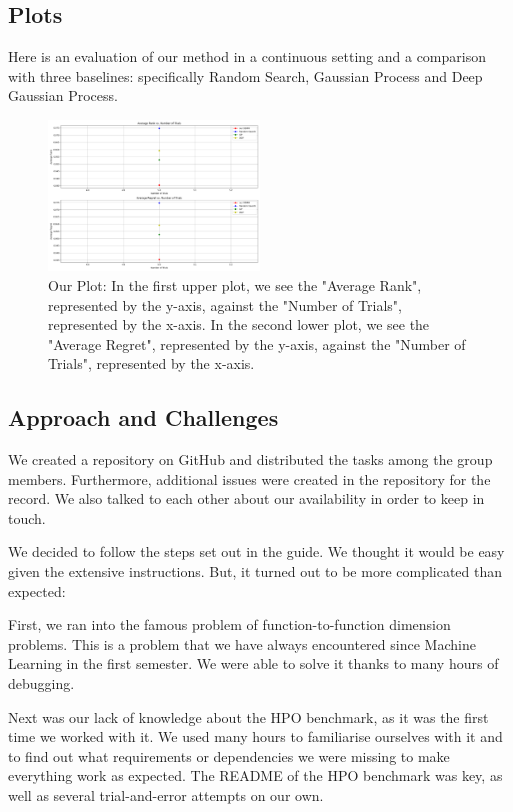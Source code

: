 \documentclass[10pt,a4paper,twocolumn]{article}
\begin{document}
{\subsection{Plots}
Here is an evaluation of our method in a continuous setting and a comparison with three baselines: specifically Random Search, Gaussian Process and Deep Gaussian Process.

\begin{figure}[h]
\includegraphics[width=0.5\textwidth]{img/average_metrics.png}
\caption{Our Plot: In the first upper plot, we see the "Average Rank", represented by the y-axis, against the "Number of Trials", represented by the x-axis. In the second lower plot, we see the "Average Regret", represented by the y-axis, against the "Number of Trials", represented by the x-axis.}
\label{fig:ourplot}
\end{figure}

\subsection{Approach and Challenges}
We created a repository on GitHub and distributed the tasks among the group members. Furthermore, additional issues were created in the repository for the record. We also talked to each other about our availability in order to keep in touch.

We decided to follow the steps set out in the guide. We thought it would be easy given the extensive instructions. But, it turned out to be more complicated than expected:

First, we ran into the famous problem of function-to-function dimension problems. This is a problem that we have always encountered since Machine Learning in the first semester. We were able to solve it thanks to many hours of debugging. 

Next was our lack of knowledge about the HPO benchmark, as it was the first time we worked with it. We used many hours to familiarise ourselves with it and to find out what requirements or dependencies we were missing to make everything work as expected. The README of the HPO benchmark was key, as well as several trial-and-error attempts on our own.

}
\end{document}
